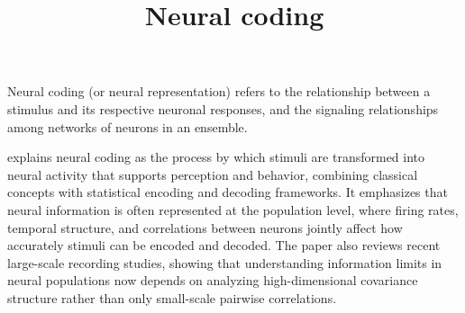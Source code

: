 \documentclass[a4paper]{article}
\title{Neural coding}
\date{}
\begin{document}
    \maketitle
    
    Neural coding (or neural representation) refers to the relationship between a stimulus and its respective neuronal responses, and the signaling relationships among networks of neurons in an ensemble. 
    
    \cite{shimazaki-2025-neural-coding-foundational-concepts-statistical-formulations-and-recent-advances} explains neural coding as the process by which stimuli are transformed into neural activity that supports perception and behavior, combining classical concepts with statistical encoding and decoding frameworks. It emphasizes that neural information is often represented at the population level, where firing rates, temporal structure, and correlations between neurons jointly affect how accurately stimuli can be encoded and decoded. The paper also reviews recent large-scale recording studies, showing that understanding information limits in neural populations now depends on analyzing high-dimensional covariance structure rather than only small-scale pairwise correlations.
    
    
    
    
    
\end{document}
